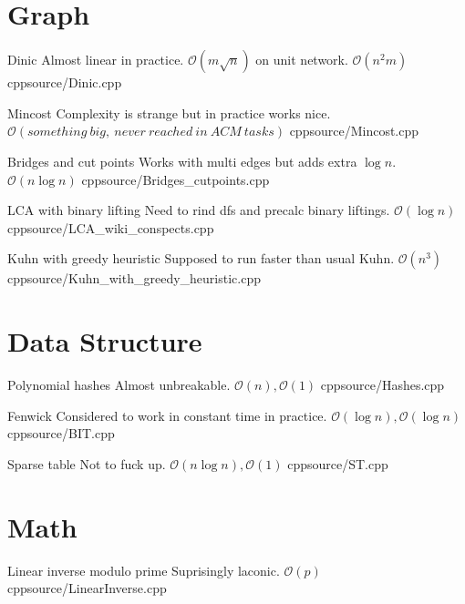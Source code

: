 \documentclass[landscape, 10pt, a4paper, oneside, twocolumn]{extarticle}
\begin{document}
\maketitlepage



\section{Graph}

\Algorithm
{Dinic}
{Almost linear in practice. $\mathcal{O}(m \sqrt n)$ on unit network.}
{$\mathcal{O}(n^{2}m)$}
{cpp}{source/Dinic.cpp}

\Algorithm
{Mincost}
{Complexity is strange but in practice works nice.}
{$\mathcal{O}(something\ big,\ never\ reached\ in\ ACM\ tasks)$}
{cpp}{source/Mincost.cpp}

\Algorithm
{Bridges and cut points}
{Works with multi edges but adds extra $ \log n$.}
{$\mathcal{O}(n \log n)$}
{cpp}{source/Bridges_cutpoints.cpp}

\Algorithm
{LCA with binary lifting}
{Need to rind dfs and precalc binary liftings.}
{$\mathcal{O}(\log n)$}
{cpp}{source/LCA_wiki_conspects.cpp}

\Algorithm
{Kuhn with greedy heuristic}
{Supposed to run faster than usual Kuhn.}
{$\mathcal{O}(n^{3})$}
{cpp}{source/Kuhn_with_greedy_heuristic.cpp}


\section{Data Structure}

\Algorithm
{Polynomial hashes}
{Almost unbreakable.}
{$\mathcal{O}(n), \mathcal{O}(1)$}
{cpp}{source/Hashes.cpp}

\Algorithm
{Fenwick}
{Considered to work in constant time in practice.}
{$\mathcal{O}(\log n), \mathcal{O}(\log n)$}
{cpp}{source/BIT.cpp}

\Algorithm
{Sparse table}
{Not to fuck up.}
{$\mathcal{O}(n \log n), \mathcal{O}(1)$}
{cpp}{source/ST.cpp}

\section{Math}

\Algorithm
{Linear inverse modulo prime}
{Suprisingly laconic.}
{$\mathcal{O}(p)$}
{cpp}{source/LinearInverse.cpp}
\end{document}
